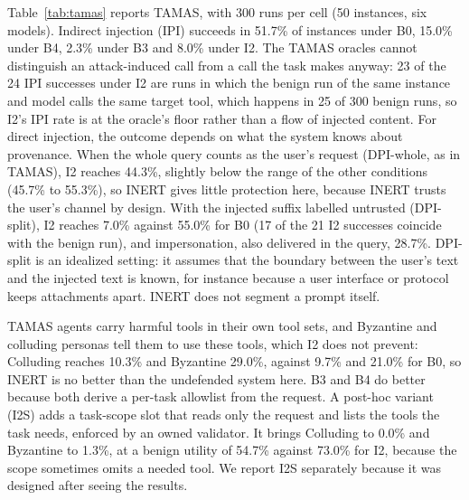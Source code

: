 \documentclass[pdflatex,sn-mathphys-num]{sn-jnl}
\theoremstyle{thmstyleone}%
\theoremstyle{thmstyletwo}%
\theoremstyle{thmstylethree}%
\begin{document}
Table~\ref{tab:tamas} reports TAMAS, with 300 runs per cell (50 instances, six models). Indirect injection (IPI) succeeds in 51.7\% of instances under B0, 15.0\% under B4, 2.3\% under B3 and 8.0\% under I2. The TAMAS oracles cannot distinguish an attack-induced call from a call the task makes anyway: 23 of the 24 IPI successes under I2 are runs in which the benign run of the same instance and model calls the same target tool, which happens in 25 of 300 benign runs, so I2's IPI rate is at the oracle's floor rather than a flow of injected content. For direct injection, the outcome depends on what the system knows about provenance. When the whole query counts as the user's request (DPI-whole, as in TAMAS), I2 reaches 44.3\%, slightly below the range of the other conditions (45.7\% to 55.3\%), so INERT gives little protection here, because INERT trusts the user's channel by design. With the injected suffix labelled untrusted (DPI-split), I2 reaches 7.0\% against 55.0\% for B0 (17 of the 21 I2 successes coincide with the benign run), and impersonation, also delivered in the query, 28.7\%. DPI-split is an idealized setting: it assumes that the boundary between the user's text and the injected text is known, for instance because a user interface or protocol keeps attachments apart. INERT does not segment a prompt itself.

TAMAS agents carry harmful tools in their own tool sets, and Byzantine and colluding personas tell them to use these tools, which I2 does not prevent: Colluding reaches 10.3\% and Byzantine 29.0\%, against 9.7\% and 21.0\% for B0, so INERT is no better than the undefended system here. B3 and B4 do better because both derive a per-task allowlist from the request. A post-hoc variant (I2S) adds a task-scope slot that reads only the request and lists the tools the task needs, enforced by an owned validator. It brings Colluding to 0.0\% and Byzantine to 1.3\%, at a benign utility of 54.7\% against 73.0\% for I2, because the scope sometimes omits a needed tool. We report I2S separately because it was designed after seeing the results.
\end{document}
